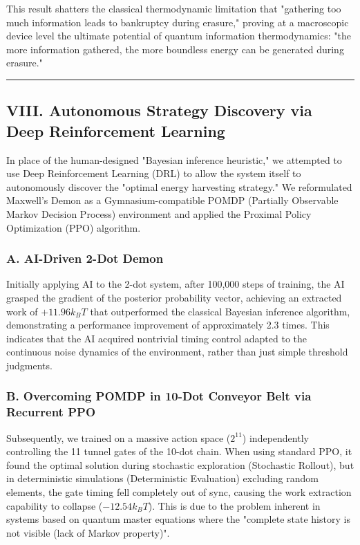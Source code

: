 \documentclass[a4paper,11pt]{article}
\begin{document}
This result shatters the classical thermodynamic limitation that "gathering too much information leads to bankruptcy during erasure," proving at a macroscopic device level the ultimate potential of quantum information thermodynamics: "the more information gathered, the more boundless energy can be generated during erasure."

\vspace{1em}\hrule\vspace{1em}

\subsection*{VIII. Autonomous Strategy Discovery via Deep Reinforcement Learning}
In place of the human-designed "Bayesian inference heuristic," we attempted to use Deep Reinforcement Learning (DRL) to allow the system itself to autonomously discover the "optimal energy harvesting strategy."
We reformulated Maxwell's Demon as a Gymnasium-compatible POMDP (Partially Observable Markov Decision Process) environment and applied the Proximal Policy Optimization (PPO) algorithm.

\subsubsection*{A. AI-Driven 2-Dot Demon}
Initially applying AI to the 2-dot system, after 100,000 steps of training, the AI grasped the gradient of the posterior probability vector, achieving an extracted work of $+11.96 k_B T$ that outperformed the classical Bayesian inference algorithm, demonstrating a performance improvement of approximately 2.3 times. This indicates that the AI acquired nontrivial timing control adapted to the continuous noise dynamics of the environment, rather than just simple threshold judgments.

\subsubsection*{B. Overcoming POMDP in 10-Dot Conveyor Belt via Recurrent PPO}
Subsequently, we trained on a massive action space ($2^{11}$) independently controlling the 11 tunnel gates of the 10-dot chain. When using standard PPO, it found the optimal solution during stochastic exploration (Stochastic Rollout), but in deterministic simulations (Deterministic Evaluation) excluding random elements, the gate timing fell completely out of sync, causing the work extraction capability to collapse ($-12.54 k_B T$).
This is due to the problem inherent in systems based on quantum master equations where the "complete state history is not visible (lack of Markov property)".
\end{document}
